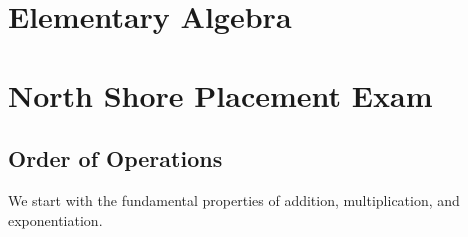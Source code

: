 \documentclass[crop=false,class=article,oneside]{standalone}
\begin{document}
    \ifx\ifmathcourseselementaryalgebra\undefined
        \section*{Elementary Algebra}
        \setcounter{section}{1}
        \renewcommand\thefigure{\arabic{section}.\arabic{figure}}
        \renewcommand\thesubfigure{%
            \arabic{section}.\arabic{figure}.\arabic{subfigure}}
    \else
        \section{North Shore Placement Exam}
    \fi
    \subsection{Order of Operations}
        We start with the fundamental properties of
        addition, multiplication, and exponentiation.
\end{document}
